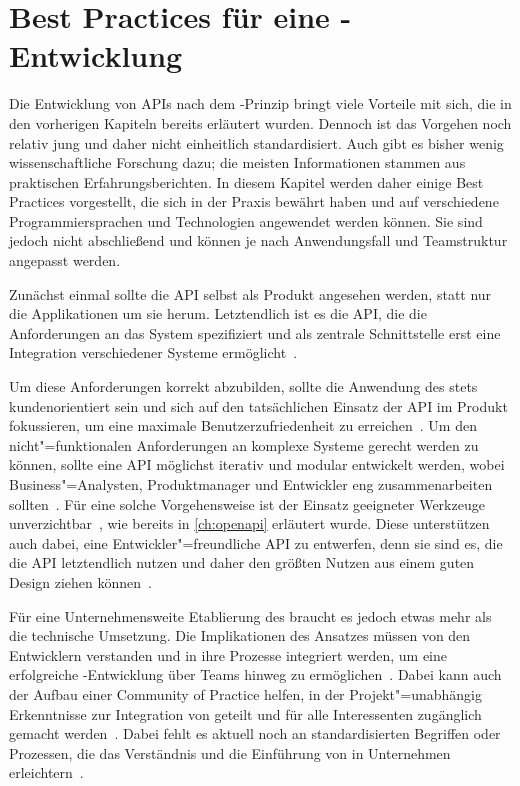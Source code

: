 \chapter{Best Practices für eine \AF-Entwicklung}
Die Entwicklung von \acp{API} nach dem \AF-Prinzip bringt viele Vorteile mit sich, die in den vorherigen Kapiteln bereits erläutert wurden.
Dennoch ist das Vorgehen noch relativ jung und daher nicht einheitlich standardisiert.
Auch gibt es bisher wenig wissenschaftliche Forschung dazu; die meisten Informationen stammen aus praktischen Erfahrungsberichten.
In diesem Kapitel werden daher einige Best Practices vorgestellt, die sich in der Praxis bewährt haben und auf verschiedene Programmiersprachen und Technologien angewendet werden können.
Sie sind jedoch nicht abschließend und können je nach Anwendungsfall und Teamstruktur angepasst werden.

Zunächst einmal sollte die \ac{API} selbst als Produkt angesehen werden, statt nur die Applikationen um sie herum.
Letztendlich ist es die \ac{API}, die die Anforderungen an das System spezifiziert und als zentrale Schnittstelle erst eine Integration verschiedener Systeme ermöglicht~\cite[350]{de23}.

Um diese Anforderungen korrekt abzubilden, sollte die Anwendung des \AFAes stets kundenorientiert sein und sich auf den tatsächlichen Einsatz der \ac{API} im Produkt fokussieren, um eine maximale Benutzerzufriedenheit zu erreichen~\cite[1627]{cha21}.
Um den nicht"=funktionalen Anforderungen an komplexe Systeme gerecht werden zu können, sollte eine \ac{API} möglichst iterativ und modular entwickelt werden, wobei Business"=Analysten, Produktmanager und Entwickler eng zusammenarbeiten sollten~\cite[352]{de23}.
Für eine solche Vorgehensweise ist der Einsatz geeigneter Werkzeuge unverzichtbar~\cite[1628]{cha21}, wie bereits in \autoref{ch:openapi} erläutert wurde.
Diese unterstützen auch dabei, eine Entwickler"=freundliche \ac{API} zu entwerfen, denn sie sind es, die die \ac{API} letztendlich nutzen und daher den größten Nutzen aus einem guten Design ziehen können~\cite[355]{de23}.

Für eine Unternehmensweite Etablierung des \AFAes braucht es jedoch etwas mehr als die technische Umsetzung.
Die Implikationen des Ansatzes müssen von den Entwicklern verstanden und in ihre Prozesse integriert werden, um eine erfolgreiche \AF-Entwicklung über Teams hinweg zu ermöglichen~\cite[359]{de23}.
Dabei kann auch der Aufbau einer Community of Practice helfen, in der Projekt"=unabhängig Erkenntnisse zur Integration von \AF geteilt und für alle Interessenten zugänglich gemacht werden~\cite[4]{kul23}.
Dabei fehlt es aktuell noch an standardisierten Begriffen oder Prozessen, die das Verständnis und die Einführung von \AF in Unternehmen erleichtern~\cites[77]{bea22}[2]{kul23}.

